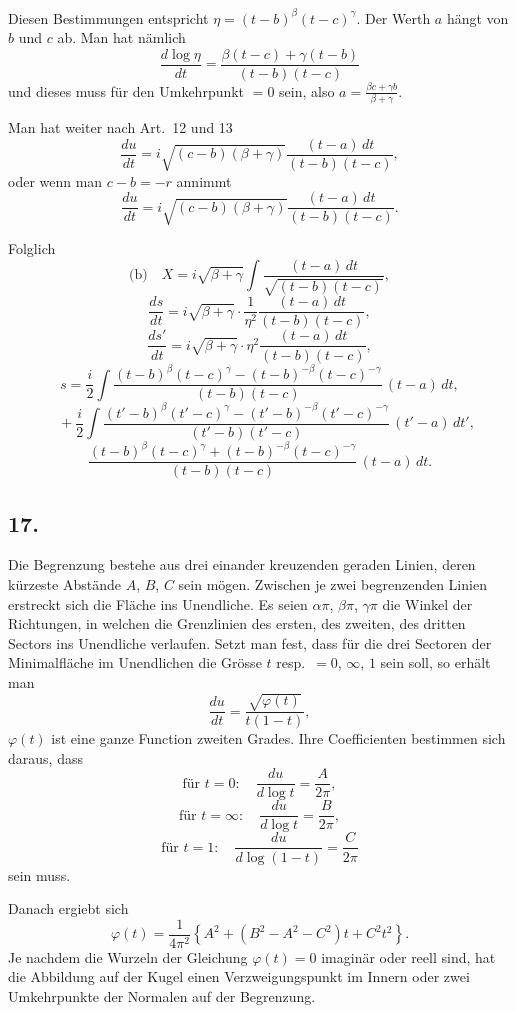\documentclass[12pt,a4paper]{article}
\begin{document}
Diesen Bestimmungen entspricht $\eta = (t-b)^{\beta}(t-c)^{\gamma}$. Der Werth $a$ h\"angt von $b$ und $c$ ab. Man hat n\"amlich
\[\frac{d\log\eta}{dt} = \frac{\beta(t-c) + \gamma(t-b)}{(t-b)(t-c)}\]
und dieses muss f\"ur den Umkehrpunkt $=0$ sein, also $a = \frac{\beta c + \gamma b}{\beta + \gamma}$.

Man hat weiter nach Art.~12 und 13
\[\frac{du}{dt} = i\sqrt{(c-b)(\beta+\gamma)} \frac{(t-a)\, dt}{(t-b)(t-c)},\]
oder wenn man $c - b = -r$ annimmt
\[\frac{du}{dt} = i\sqrt{(c-b)(\beta+\gamma)} \frac{(t-a)\, dt}{(t-b)(t-c)}.\]

\newpage
Folglich
\[\text{(b)} \quad X = i\sqrt{\beta+\gamma} \int \frac{(t-a)\, dt}{\sqrt{(t-b)(t-c)}},\]
\[\frac{ds}{dt} = i\sqrt{\beta+\gamma} \cdot \frac{1}{\eta^{2}} \frac{(t-a)\, dt}{(t-b)(t-c)},\]
\[\frac{ds'}{dt} = i\sqrt{\beta+\gamma} \cdot \eta^{2} \frac{(t-a)\, dt}{(t-b)(t-c)},\]
\[s = \frac{i}{2} \int \frac{(t-b)^{\beta}(t-c)^{\gamma} - (t-b)^{-\beta}(t-c)^{-\gamma}}{(t-b)(t-c)}\, (t-a)\, dt,\]
\[\quad + \frac{i}{2} \int \frac{(t'-b)^{\beta}(t'-c)^{\gamma} - (t'-b)^{-\beta}(t'-c)^{-\gamma}}{(t'-b)(t'-c)}\, (t'-a)\, dt',\]
\[\frac{(t-b)^{\beta}(t-c)^{\gamma} + (t-b)^{-\beta}(t-c)^{-\gamma}}{(t-b)(t-c)}\, (t-a)\, dt.\]

\subsection*{17.}

Die Begrenzung bestehe aus drei einander kreuzenden geraden Linien, deren k\"urzeste Abst\"ande $A$, $B$, $C$ sein m\"ogen. Zwischen je zwei begrenzenden Linien erstreckt sich die Fl\"ache ins Unendliche. Es seien $\alpha\pi$, $\beta\pi$, $\gamma\pi$ die Winkel der Richtungen, in welchen die Grenzlinien des ersten, des zweiten, des dritten Sectors ins Unendliche verlaufen. Setzt man fest, dass f\"ur die drei Sectoren der Minimalfl\"ache im Unendlichen die Gr\"osse $t$ resp.\ $= 0$, $\infty$, $1$ sein soll, so erh\"alt man
\[\frac{du}{dt} = \frac{\sqrt{\varphi(t)}}{t(1-t)},\]
$\varphi(t)$ ist eine ganze Function zweiten Grades. Ihre Coefficienten bestimmen sich daraus, dass
\[\text{f\"ur } t = 0: \quad \frac{du}{d\log t} = \frac{A}{2\pi},\]
\[\text{f\"ur } t = \infty: \quad \frac{du}{d\log t} = \frac{B}{2\pi},\]
\[\text{f\"ur } t = 1: \quad \frac{du}{d\log(1-t)} = \frac{C}{2\pi}\]
sein muss.

Danach ergiebt sich
\[\varphi(t) = \frac{1}{4\pi^{2}} \left\{A^{2} + (B^{2} - A^{2} - C^{2})t + C^{2}t^{2}\right\}.\]
Je nachdem die Wurzeln der Gleichung $\varphi(t) = 0$ imagin\"ar oder reell sind, hat die Abbildung auf der Kugel einen Verzweigungspunkt im Innern oder zwei Umkehrpunkte der Normalen auf der Begrenzung.
\end{document}
